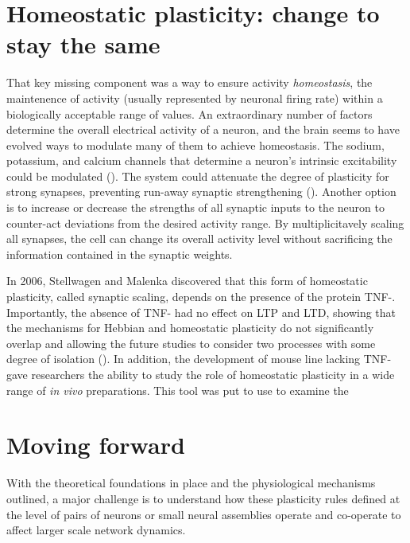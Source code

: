 \section{Homeostatic plasticity: change to stay the same}

That key missing component was a way to ensure activity \textit{homeostasis}, the maintenence of activity (usually represented by neuronal firing rate) within a biologically acceptable range of values. An extraordinary number of factors determine the overall electrical activity of a neuron, and the brain seems to have evolved ways to modulate many of them to achieve homeostasis. The sodium, potassium, and calcium channels that determine a neuron's intrinsic excitability could be modulated (\cite{Franklin1992}). The system could attenuate the degree of plasticity for strong synapses, preventing run-away synaptic strengthening (\cite{VanRossum2000}). Another option is to increase or decrease the strengths of all synaptic inputs to the neuron to counter-act deviations from the desired activity range. By multiplicitavely scaling all synapses, the cell can change its overall activity level without sacrificing the information contained in the synaptic weights.

In 2006, Stellwagen and Malenka discovered that this form of homeostatic plasticity, called synaptic scaling, depends on the presence of the protein TNF-\textalpha{}. Importantly, the absence of TNF-\textalpha{} had no effect on LTP and LTD, showing that the mechanisms for Hebbian and homeostatic plasticity do not significantly overlap and allowing the future studies to consider two processes with some degree of isolation (\cite{Stellwagen2006}). In addition, the development of mouse line lacking TNF-\textalpha{} gave researchers the ability to study the role of homeostatic plasticity in a wide range of \textit{in vivo} preparations. This tool was put to use to examine the 

\section{Moving forward}

With the theoretical foundations in place and the physiological mechanisms outlined, a major challenge is to understand how these plasticity rules defined at the level of pairs of neurons or small neural assemblies operate and co-operate to affect larger scale network dynamics.


